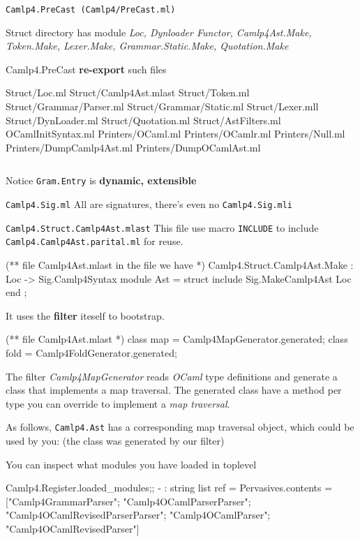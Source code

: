 \documentclass[svgnames,12pt,a4paper]{report}
\begin{document}
\verb|Camlp4.PreCast (Camlp4/PreCast.ml)|

Struct directory has module \textit{Loc, Dynloader Functor,
  Camlp4Ast.Make, Token.Make, Lexer.Make, Grammar.Static.Make,
  Quotation.Make}

Camlp4.PreCast \textbf{re-export} such files

    \begin{bluetext}
    Struct/Loc.ml 
    Struct/Camlp4Ast.mlast 
    Struct/Token.ml 
    Struct/Grammar/Parser.ml 
    Struct/Grammar/Static.ml 
    Struct/Lexer.mll 
    Struct/DynLoader.ml 
    Struct/Quotation.ml 
    Struct/AstFilters.ml 
    OCamlInitSyntax.ml 
    Printers/OCaml.ml 
    Printers/OCamlr.ml
    Printers/Null.ml 
    Printers/DumpCamlp4Ast.ml
    Printers/DumpOCamlAst.ml 
    \end{bluetext}


\inputminted{ocaml}{camlp4/code/PreCast_OCamlInitSyntax.ml}


Notice \verb|Gram.Entry| is \textbf{ dynamic, extensible}


\verb|Camlp4.Sig.ml| All are signatures, there's even no
\verb|Camlp4.Sig.mli|

\verb|Camlp4.Struct.Camlp4Ast.mlast| This file use macro
\verb|INCLUDE| to include \verb|Camlp4.Camlp4Ast.parital.ml| for
reuse.
    

\begin{bluecode}
(** file Camlp4Ast.mlast 
  in the file we have *)
Camlp4.Struct.Camlp4Ast.Make : Loc -> Sig.Camlp4Syntax
  module Ast = struct
     include Sig.MakeCamlp4Ast Loc 
  end ;
\end{bluecode}

It uses the \textbf{ filter} iteself to bootstrap.

\begin{bluecode}
(** file Camlp4Ast.mlast *)
class map = Camlp4MapGenerator.generated;
class fold = Camlp4FoldGenerator.generated;
\end{bluecode}


The filter \emph{Camlp4MapGenerator} reads \emph{OCaml} type
definitions and generate a class that implements a map traversal.  The
generated class have a method per type you can override to implement a
\emph{map traversal}.

As follows, \verb|Camlp4.Ast| has a corresponding map traversal
object, which could be used by you: (the class was generated by our
filter)


You can inspect what modules you have loaded in toplevel
\begin{bluecode}
Camlp4.Register.loaded_modules;;
- : string list ref =
{Pervasives.contents =
  ["Camlp4GrammarParser"; "Camlp4OCamlParserParser";
   "Camlp4OCamlRevisedParserParser"; "Camlp4OCamlParser";
   "Camlp4OCamlRevisedParser"]}
\end{bluecode}
\end{document}
